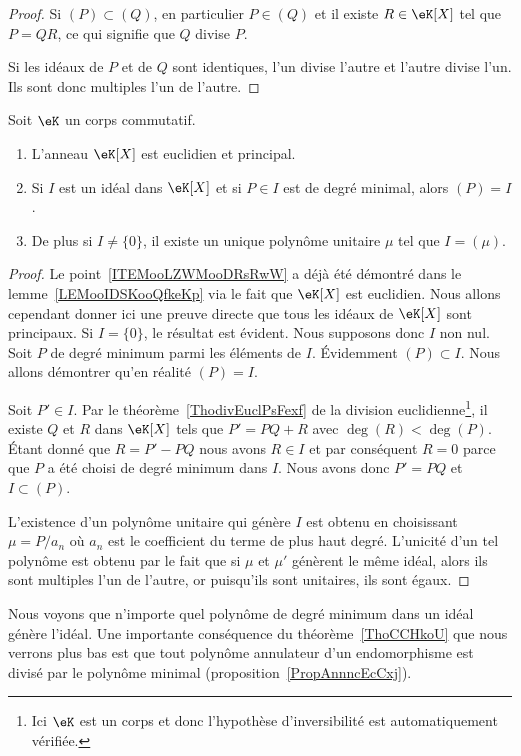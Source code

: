 \begin{proof}
	Si \( (P)\subset (Q)\), en particulier \( P\in(Q)\) et il existe \( R\in\eK[X]\) tel que \( P=QR\), ce qui signifie que \( Q\) divise \( P\).

	Si les idéaux de \( P\) et de \( Q\) sont identiques, l'un divise l'autre et l'autre divise l'un. Ils sont donc multiples l'un de l'autre.
\end{proof}

\begin{theorem}     \label{ThoCCHkoU}
	Soit \( \eK\) un corps commutatif.
	\begin{enumerate}
		\item       \label{ITEMooLZWMooDRsRwW}
		      L'anneau \( \eK[X]\) est euclidien et principal.
		\item
		      Si \( I\) est un idéal dans \( \eK[X]\) et si \( P \in I\) est de degré minimal, alors \( (P)=I\).
		\item   \label{ITEMooASHKooZqkiCH}
		      De plus si \( I\neq \{  0\}\), il existe un unique polynôme unitaire \( \mu\) tel que \( I=(\mu)\).
	\end{enumerate}
\end{theorem}

\begin{proof}
	Le point~\ref{ITEMooLZWMooDRsRwW} a déjà été démontré dans le lemme~\ref{LEMooIDSKooQfkeKp} via le fait que \( \eK[X]\) est euclidien. Nous allons cependant donner ici une preuve directe que tous les idéaux de \( \eK[X]\) sont principaux. Si \( I=\{ 0 \}\), le résultat est évident. Nous supposons donc \( I\) non nul. Soit \( P\) de degré minimum parmi les éléments de \( I\). Évidemment \( (P)\subset I\). Nous allons démontrer qu'en réalité \( (P)=I\).

	Soit \( P'\in I\). Par le théorème~\ref{ThodivEuclPsFexf} de la division euclidienne\footnote{Ici \( \eK\) est un corps et donc l'hypothèse d'inversibilité est automatiquement vérifiée.}, il existe \( Q\) et \( R\) dans \( \eK[X]\) tels que \( P'=PQ+R\) avec \( \deg(R)<\deg(P)\). Étant donné que \( R=P'-PQ\) nous avons \( R\in I\) et par conséquent \( R=0\) parce que \( P\) a été choisi de degré minimum dans \( I\). Nous avons donc \( P'=PQ\) et \( I\subset (P)\).

	L'existence d'un polynôme unitaire qui génère \( I\) est obtenu en choisissant \( \mu =P/a_n\) où \( a_n\) est le coefficient du terme de plus haut degré. L'unicité d'un tel polynôme est obtenu par le fait que si \( \mu \) et \( \mu' \) génèrent le même idéal, alors ils sont multiples l'un de l'autre, or puisqu'ils sont unitaires, ils sont égaux.
\end{proof}
Nous voyons que n'importe quel polynôme de degré minimum dans un idéal génère l'idéal. Une importante conséquence du théorème~\ref{ThoCCHkoU} que nous verrons plus bas est que tout polynôme annulateur d'un endomorphisme est divisé par le polynôme minimal (proposition~\ref{PropAnnncEcCxj}).

